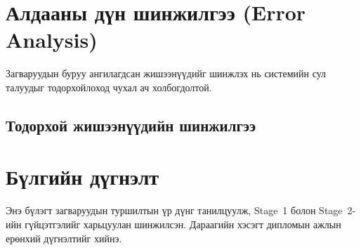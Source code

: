 \section{Алдааны дүн шинжилгээ (Error Analysis)}

Загваруудын буруу ангилагдсан жишээнүүдийг шинжлэх нь системийн сул талуудыг
тодорхойлоход чухал ач холбогдолтой.


\subsection{Тодорхой жишээнүүдийн шинжилгээ}


\section{Бүлгийн дүгнэлт}


Энэ бүлэгт загваруудын туршилтын үр дүнг танилцуулж, Stage~1 болон Stage~2-ийн
гүйцэтгэлийг харьцуулан шинжилсэн. Дараагийн хэсэгт дипломын ажлын ерөнхий
дүгнэлтийг хийнэ.
